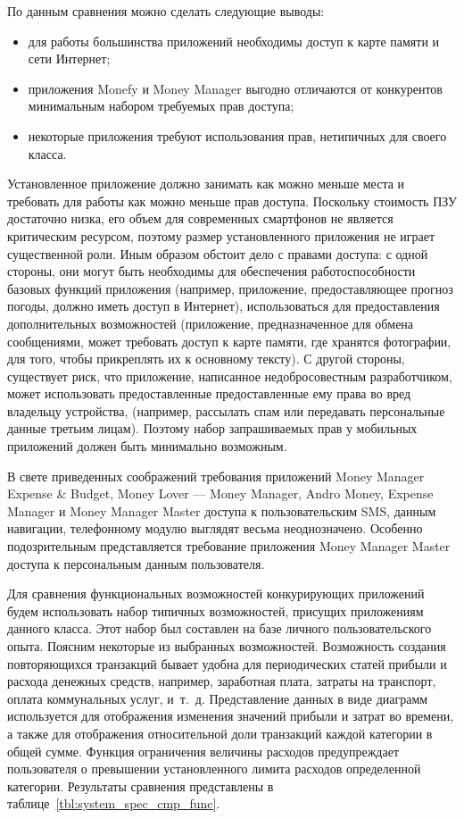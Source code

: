 \vspace{-2.5mm}

По данным сравнения можно сделать следующие выводы:
\begin{itemize}
\item для работы большинства приложений необходимы доступ
  к карте памяти и сети Интернет;
\item приложения Monefy и Money Manager выгодно отличаются от конкурентов
  минимальным набором требуемых прав доступа;
\item некоторые приложения требуют использования прав,
  нетипичных для своего класса.
\end{itemize}

Установленное приложение должно занимать как можно меньше места и
требовать для работы как можно меньше прав доступа.
Поскольку стоимость ПЗУ достаточно низка, его объем для современных смартфонов
не является критическим ресурсом, поэтому размер установленного приложения не играет
существенной роли.
Иным образом обстоит дело с правами доступа:
с одной стороны, они могут быть необходимы для обеспечения работоспособности
базовых функций приложения (например, приложение, предоставляющее прогноз погоды,
должно иметь доступ в Интернет), использоваться для предоставления дополнительных
возможностей (приложение, предназначенное для обмена сообщениями,
может требовать доступ к карте памяти, где хранятся фотографии, для того, чтобы
прикреплять их к основному тексту).
С другой стороны, существует риск, что приложение, написанное недобросовестным
разработчиком, может использовать предоставленные предоставленные ему права
во вред владельцу устройства, (например, рассылать спам или передавать
персональные данные третьим лицам).
Поэтому набор запрашиваемых прав у мобильных приложений должен быть
минимально возможным.

В свете приведенных соображений требования приложений
Money Manager Expense \& Budget, Money Lover --- Money Manager,
Andro Money, Expense Manager и Money Manager Master доступа
к пользовательским SMS, данным навигации,
телефонному модулю выглядят весьма неоднозначено.
Особенно подозрительным представляется требование приложения
Money Manager Master доступа к персональным данным пользователя.

Для сравнения функциональных возможностей конкурирующих приложений
будем использовать набор типичных возможностей,
присущих приложениям данного класса.
Этот набор был составлен на базе личного пользовательского опыта.
Поясним некоторые из выбранных возможностей.
Возможность создания повторяющихся транзакций бывает удобна для
периодических статей прибыли и расхода денежных средств, например,
заработная плата, затраты на транспорт, оплата коммунальных услуг, и~т.~д.
Представление данных в виде диаграмм используется
для отображения изменения значений прибыли и затрат во времени,
а также для отображения относительной доли транзакций
каждой категории в общей сумме.
Функция ограничения величины расходов предупреждает пользователя
о превышении установленного лимита расходов определенной категории.
Результаты сравнения представлены в таблице~\ref{tbl:system_spec_cmp_func}.

